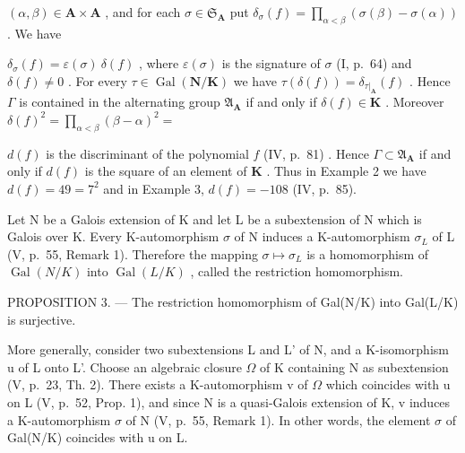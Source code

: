 \((\alpha, \beta) \in \mathbf{A} \times \mathbf{A}\) , and for each \(\sigma \in \mathfrak{S}_{\mathbf{A}}\) put \(\delta_{\sigma}(f) = \prod_{\alpha < \beta} (\sigma(\beta) - \sigma(\alpha))\) . We have

\(\delta_{\sigma}(f) = \varepsilon(\sigma)\ \delta(f)\) , where \(\varepsilon(\sigma)\) is the signature of \(\sigma\) (I, p.~64) and \(\delta(f) \neq 0\) . For every \(\tau \in \operatorname{Gal}(\mathbf{N}/\mathbf{K})\) we have \(\tau(\delta(f)) = \delta_{\tau|_{\mathbf{A}}}(f)\) . Hence \(\Gamma\) is contained in the alternating group \(\mathfrak{A}_{\mathbf{A}}\) if and only if \(\delta(f) \in \mathbf{K}\) . Moreover \(\delta(f)^2 = \prod_{\alpha < \beta} (\beta - \alpha)^2 =\)

\(d(f)\) is the discriminant of the polynomial \(f\) (IV, p.~81) . Hence \(\Gamma \subset \mathfrak{A}_{\mathbf{A}}\) if and only if \(d(f)\) is the square of an element of \(\mathbf{K}\) . Thus in Example 2 we have \(d(f) = 49 = 7^2\) and in Example 3, \(d(f) = -108\) (IV, p.~85).

Let N be a Galois extension of K and let L be a subextension of N which is Galois over K. Every K-automorphism \(\sigma\) of N induces a K-automorphism \(\sigma_{L}\) of L (V, p.~55, Remark 1). Therefore the mapping \(\sigma \mapsto \sigma_{L}\) is a homomorphism of \(\operatorname{Gal}(N/K)\) into \(\operatorname{Gal}(L/K)\) , called the restriction homomorphism.

PROPOSITION 3. --- The restriction homomorphism of Gal(N/K) into Gal(L/K) is surjective.

More generally, consider two subextensions L and L' of N, and a K-isomorphism u of L onto L'. Choose an algebraic closure \(\Omega\) of K containing N as subextension (V, p.~23, Th. 2). There exists a K-automorphism v of \(\Omega\) which coincides with u on L (V, p.~52, Prop. 1), and since N is a quasi-Galois extension of K, v induces a K-automorphism \(\sigma\) of N (V, p.~55, Remark 1). In other words, the element \(\sigma\) of Gal(N/K) coincides with u on L.

